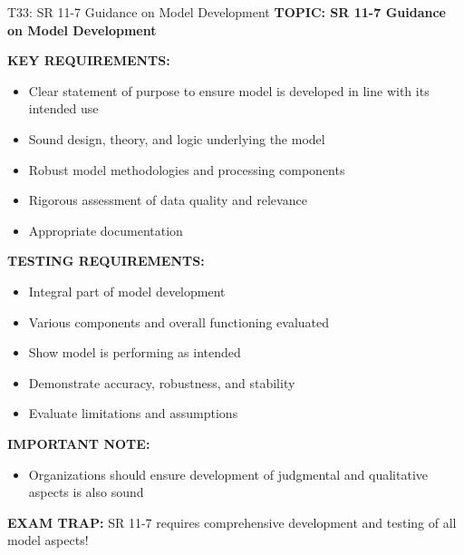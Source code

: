 \documentclass[8pt]{beamer}
\begin{document}
	\begin{frame}{T33: SR 11-7 Guidance on Model Development}
		\fontsize{6.5}{7.5}\selectfont
		\textbf{TOPIC: SR 11-7 Guidance on Model Development}
		
		\vspace{0.1cm}
		\textbf{KEY REQUIREMENTS:}
		\begin{itemize}
			\item Clear statement of purpose to ensure model is developed in line with its intended use
			\item Sound design, theory, and logic underlying the model
			\item Robust model methodologies and processing components
			\item Rigorous assessment of data quality and relevance
			\item Appropriate documentation
		\end{itemize}
		
		\vspace{0.1cm}
		\textbf{TESTING REQUIREMENTS:}
		\begin{itemize}
			\item Integral part of model development
			\item Various components and overall functioning evaluated
			\item Show model is performing as intended
			\item Demonstrate accuracy, robustness, and stability
			\item Evaluate limitations and assumptions
		\end{itemize}
		
		\vspace{0.1cm}
		\textbf{IMPORTANT NOTE:}
		\begin{itemize}
			\item Organizations should ensure development of judgmental and qualitative aspects is also sound
		\end{itemize}
		
		\textcolor{myred}{\textbf{EXAM TRAP:}} SR 11-7 requires \textcolor{myblue}{comprehensive development and testing of all model aspects}!
	\end{frame}
	
\end{document}
